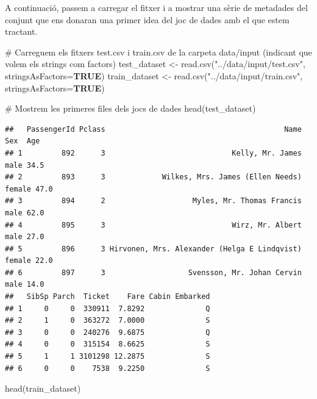 \documentclass[
]{article}
\newenvironment{Shaded}{\begin{snugshade}}{\end{snugshade}}
\newcommand{\AttributeTok}[1]{\textcolor[rgb]{0.80,0.80,0.80}{#1}}
\newcommand{\CommentTok}[1]{\textcolor[rgb]{0.50,0.62,0.50}{#1}}
\newcommand{\ConstantTok}[1]{\textcolor[rgb]{0.86,0.64,0.64}{\textbf{#1}}}
\newcommand{\FunctionTok}[1]{\textcolor[rgb]{0.94,0.94,0.56}{#1}}
\newcommand{\NormalTok}[1]{\textcolor[rgb]{0.80,0.80,0.80}{#1}}
\newcommand{\OtherTok}[1]{\textcolor[rgb]{0.94,0.94,0.56}{#1}}
\newcommand{\StringTok}[1]{\textcolor[rgb]{0.80,0.58,0.58}{#1}}
\begin{document}
A continuació, passem a carregar el fitxer i a mostrar una sèrie de
metadades del conjunt que ens donaran una primer idea del joc de dades
amb el que estem tractant.

\begin{Shaded}
\begin{Highlighting}[]
\CommentTok{\# Carreguem els fitxers \textquotesingle{}test.csv\textquotesingle{} i \textquotesingle{}train.csv\textquotesingle{} de la carpeta \textquotesingle{}data/input\textquotesingle{} (indicant que volem els \textquotesingle{}strings\textquotesingle{} com \textquotesingle{}factors\textquotesingle{})}
\NormalTok{test\_dataset }\OtherTok{\textless{}{-}} \FunctionTok{read.csv}\NormalTok{(}\StringTok{"../data/input/test.csv"}\NormalTok{, }\AttributeTok{stringsAsFactors=}\ConstantTok{TRUE}\NormalTok{)}
\NormalTok{train\_dataset }\OtherTok{\textless{}{-}} \FunctionTok{read.csv}\NormalTok{(}\StringTok{"../data/input/train.csv"}\NormalTok{, }\AttributeTok{stringsAsFactors=}\ConstantTok{TRUE}\NormalTok{)}

\CommentTok{\# Mostrem les primeres files dels jocs de dades}
\FunctionTok{head}\NormalTok{(test\_dataset)}
\end{Highlighting}
\end{Shaded}

\begin{verbatim}
##   PassengerId Pclass                                         Name    Sex  Age
## 1         892      3                             Kelly, Mr. James   male 34.5
## 2         893      3             Wilkes, Mrs. James (Ellen Needs) female 47.0
## 3         894      2                    Myles, Mr. Thomas Francis   male 62.0
## 4         895      3                             Wirz, Mr. Albert   male 27.0
## 5         896      3 Hirvonen, Mrs. Alexander (Helga E Lindqvist) female 22.0
## 6         897      3                   Svensson, Mr. Johan Cervin   male 14.0
##   SibSp Parch  Ticket    Fare Cabin Embarked
## 1     0     0  330911  7.8292              Q
## 2     1     0  363272  7.0000              S
## 3     0     0  240276  9.6875              Q
## 4     0     0  315154  8.6625              S
## 5     1     1 3101298 12.2875              S
## 6     0     0    7538  9.2250              S
\end{verbatim}

\begin{Shaded}
\begin{Highlighting}[]
\FunctionTok{head}\NormalTok{(train\_dataset)}
\end{Highlighting}
\end{Shaded}
\end{document}
